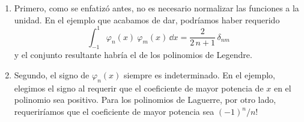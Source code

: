 \begin{enumerate}
\item Primero, como se enfatizó antes, no es necesario normalizar las funciones a la unidad. En el ejemplo que acabamos de dar, podríamos haber requerido
\begin{equation}
\int_{-1}^{1} \varphi_{n} (x) \: \varphi_{m} (x) \, \dd x = \dfrac{2}{2\, n +1} \, \delta_{nm}
\label{eq:ecuacion_10_61}
\end{equation}
y el conjunto resultante habría el de los polinomios de Legendre.
\item Segundo, el signo de $\varphi_{n} (x)$ siempre es indeterminado. En el ejemplo, elegimos el signo al requerir que el coeficiente de mayor potencia de $x$ en el polinomio sea positivo. Para los polinomios de Laguerre, por otro lado, requeriríamos que el coeficiente de mayor potencia sea $(-1)^{n}/n!$
\end{enumerate}
